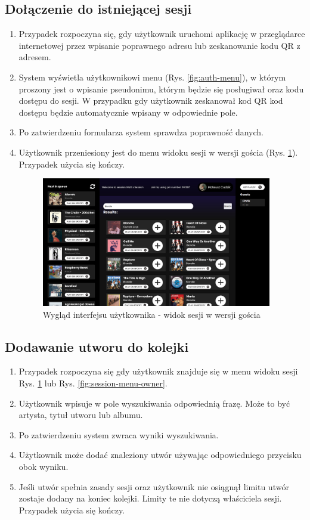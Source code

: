 \subsection{Dołączenie do istniejącej sesji}
\begin{enumerate}
\item Przypadek rozpoczyna się, gdy użytkownik uruchomi aplikację w przeglądarce internetowej przez wpisanie poprawnego adresu lub zeskanowanie kodu QR z adresem.
\item System wyświetla użytkownikowi menu (Rys. \ref{fig:auth-menu}), w którym proszony jest o wpisanie pseudonimu, którym będzie się posługiwał oraz kodu dostępu do sesji. W przypadku gdy użytkownik zeskanował kod QR kod dostępu będzie automatycznie wpisany w odpowiednie pole.
\item Po zatwierdzeniu formularza system sprawdza poprawność danych.
\item Użytkownik przeniesiony jest do menu widoku sesji w wersji gościa (Rys. \ref{fig:session-menu-guest}). Przypadek użycia się kończy.
\begin{figure}[h]
\centering
\includegraphics[width=0.95\textwidth]{./graf/guest_session_menu.PNG}
\caption{Wygląd interfejsu użytkownika - widok sesji w wersji gościa}
\label{fig:session-menu-guest}
\end{figure}
\end{enumerate}

\subsection{Dodawanie utworu do kolejki}
\begin{enumerate}
\item Przypadek rozpoczyna się gdy użytkownik znajduje się w menu widoku sesji Rys. \ref{fig:session-menu-guest} lub Rys. \ref{fig:session-menu-owner}.
\item Użytkownik wpisuje w pole wyszukiwania odpowiednią frazę. Może to być artysta, tytuł utworu lub albumu.
\item Po zatwierdzeniu system zwraca wyniki wyszukiwania.
\item Użytkownik może dodać znaleziony utwór używając odpowiedniego przycisku obok wyniku.
\item Jeśli utwór spełnia zasady sesji oraz użytkownik nie osiągnął limitu utwór zostaje dodany na koniec kolejki. Limity te nie dotyczą właściciela sesji. Przypadek użycia się kończy.
\end{enumerate}

